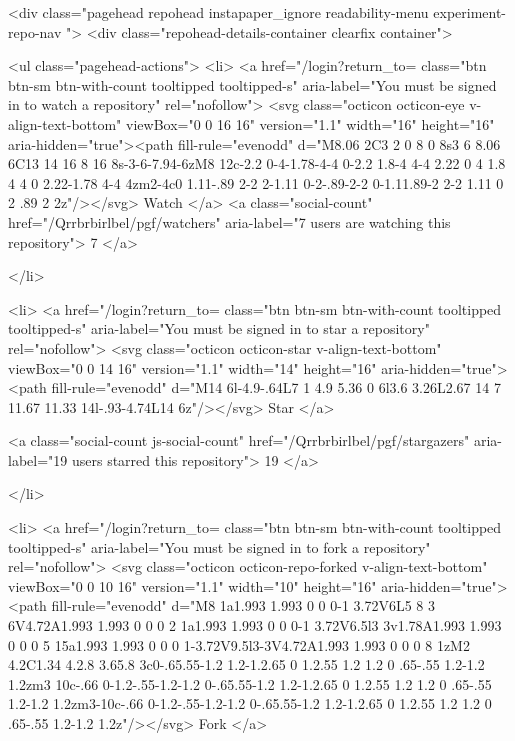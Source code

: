   <div class="pagehead repohead instapaper_ignore readability-menu experiment-repo-nav  ">
    <div class="repohead-details-container clearfix container">

      <ul class="pagehead-actions">
  <li>
      <a href="/login?return_to=%
    class="btn btn-sm btn-with-count tooltipped tooltipped-s"
    aria-label="You must be signed in to watch a repository" rel="nofollow">
    <svg class="octicon octicon-eye v-align-text-bottom" viewBox="0 0 16 16" version="1.1" width="16" height="16" aria-hidden="true"><path fill-rule="evenodd" d="M8.06 2C3 2 0 8 0 8s3 6 8.06 6C13 14 16 8 16 8s-3-6-7.94-6zM8 12c-2.2 0-4-1.78-4-4 0-2.2 1.8-4 4-4 2.22 0 4 1.8 4 4 0 2.22-1.78 4-4 4zm2-4c0 1.11-.89 2-2 2-1.11 0-2-.89-2-2 0-1.11.89-2 2-2 1.11 0 2 .89 2 2z"/></svg>
    Watch
  </a>
  <a class="social-count" href="/Qrrbrbirlbel/pgf/watchers"
     aria-label="7 users are watching this repository">
    7
  </a>

  </li>

  <li>
        <a href="/login?return_to=%
      class="btn btn-sm btn-with-count tooltipped tooltipped-s"
      aria-label="You must be signed in to star a repository" rel="nofollow">
      <svg class="octicon octicon-star v-align-text-bottom" viewBox="0 0 14 16" version="1.1" width="14" height="16" aria-hidden="true"><path fill-rule="evenodd" d="M14 6l-4.9-.64L7 1 4.9 5.36 0 6l3.6 3.26L2.67 14 7 11.67 11.33 14l-.93-4.74L14 6z"/></svg>
      Star
    </a>

    <a class="social-count js-social-count" href="/Qrrbrbirlbel/pgf/stargazers"
      aria-label="19 users starred this repository">
      19
    </a>

  </li>

  <li>
      <a href="/login?return_to=%
        class="btn btn-sm btn-with-count tooltipped tooltipped-s"
        aria-label="You must be signed in to fork a repository" rel="nofollow">
        <svg class="octicon octicon-repo-forked v-align-text-bottom" viewBox="0 0 10 16" version="1.1" width="10" height="16" aria-hidden="true"><path fill-rule="evenodd" d="M8 1a1.993 1.993 0 0 0-1 3.72V6L5 8 3 6V4.72A1.993 1.993 0 0 0 2 1a1.993 1.993 0 0 0-1 3.72V6.5l3 3v1.78A1.993 1.993 0 0 0 5 15a1.993 1.993 0 0 0 1-3.72V9.5l3-3V4.72A1.993 1.993 0 0 0 8 1zM2 4.2C1.34 4.2.8 3.65.8 3c0-.65.55-1.2 1.2-1.2.65 0 1.2.55 1.2 1.2 0 .65-.55 1.2-1.2 1.2zm3 10c-.66 0-1.2-.55-1.2-1.2 0-.65.55-1.2 1.2-1.2.65 0 1.2.55 1.2 1.2 0 .65-.55 1.2-1.2 1.2zm3-10c-.66 0-1.2-.55-1.2-1.2 0-.65.55-1.2 1.2-1.2.65 0 1.2.55 1.2 1.2 0 .65-.55 1.2-1.2 1.2z"/></svg>
        Fork
      </a>

